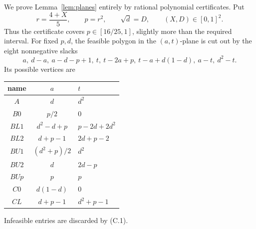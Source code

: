 \documentclass[11pt]{article}
\begin{document}
We prove Lemma~\ref{lem:planes} entirely by rational polynomial
certificates.  Put
\[
 r=\frac{4+X}{5},\qquad p=r^2,\qquad \sqrt d=D,
 \qquad (X,D)\in[0,1]^2.
\]
Thus the certificate covers \(p\in[16/25,1]\), slightly more than the
required interval.  For fixed \(p,d\), the feasible polygon in the
\((a,t)\)-plane is cut out by the eight nonnegative slacks
\[
 a,\ d-a,\ a-d-p+1,\ t,\ t-2a+p,\
 t-a+d(1-d),\ a-t,\ d^2-t.
 \tag{C.1}
\]
Its possible vertices are
\begin{center}
\begin{tabular}{ccl}
\toprule
name & \(a\) & \(t\)\\
\midrule
\(A\)   & \(d\) & \(d^2\)\\
\(B0\)  & \(p/2\) & \(0\)\\
\(BL1\) & \(d^2-d+p\) & \(p-2d+2d^2\)\\
\(BL2\) & \(d+p-1\) & \(2d+p-2\)\\
\(BU1\) & \((d^2+p)/2\) & \(d^2\)\\
\(BU2\) & \(d\) & \(2d-p\)\\
\(BUp\) & \(p\) & \(p\)\\
\(C0\)  & \(d(1-d)\) & \(0\)\\
\(CL\)  & \(d+p-1\) & \(d^2+p-1\)\\
\bottomrule
\end{tabular}
\end{center}
Infeasible entries are discarded by (C.1).
\end{document}
